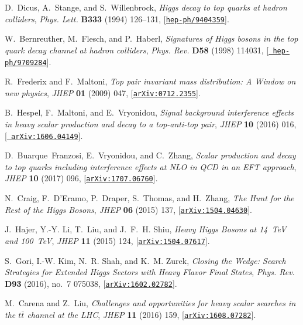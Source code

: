 \documentclass[a4paper, 11pt,notoc]{article}
\begin{document}
\begin{thebibliography}{100}
D.~Dicus, A.~Stange, and S.~Willenbrock, {\it {Higgs decay to top quarks at
  hadron colliders}},  {\em Phys. Lett.} {\bf B333} (1994) 126--131,
  [\href{http://arxiv.org/abs/hep-ph/9404359}{{\tt hep-ph/9404359}}].

W.~Bernreuther, M.~Flesch, and P.~Haberl, {\it {Signatures of Higgs bosons in
  the top quark decay channel at hadron colliders}},  {\em Phys. Rev.} {\bf
  D58} (1998) 114031, [\href{http://arxiv.org/abs/hep-ph/9709284}{{\tt
  hep-ph/9709284}}].

R.~Frederix and F.~Maltoni, {\it {Top pair invariant mass distribution: A
  Window on new physics}},  {\em JHEP} {\bf 01} (2009) 047,
  [\href{http://arxiv.org/abs/0712.2355}{{\tt arXiv:0712.2355}}].

B.~Hespel, F.~Maltoni, and E.~Vryonidou, {\it {Signal background interference
  effects in heavy scalar production and decay to a top-anti-top pair}},  {\em
  JHEP} {\bf 10} (2016) 016, [\href{http://arxiv.org/abs/1606.04149}{{\tt
  arXiv:1606.04149}}].

D.~Buarque~Franzosi, E.~Vryonidou, and C.~Zhang, {\it {Scalar production and
  decay to top quarks including interference effects at NLO in QCD in an EFT
  approach}},  {\em JHEP} {\bf 10} (2017) 096,
  [\href{http://arxiv.org/abs/1707.06760}{{\tt arXiv:1707.06760}}].

N.~Craig, F.~D'Eramo, P.~Draper, S.~Thomas, and H.~Zhang, {\it {The Hunt for
  the Rest of the Higgs Bosons}},  {\em JHEP} {\bf 06} (2015) 137,
  [\href{http://arxiv.org/abs/1504.04630}{{\tt arXiv:1504.04630}}].

J.~Hajer, Y.-Y. Li, T.~Liu, and J.~F.~H. Shiu, {\it {Heavy Higgs Bosons at 
14~TeV and 100~TeV}},  {\em JHEP} {\bf 11} (2015) 124,
  [\href{http://arxiv.org/abs/1504.07617}{{\tt arXiv:1504.07617}}].

S.~Gori, I.-W. Kim, N.~R. Shah, and K.~M. Zurek, {\it {Closing the Wedge:
  Search Strategies for Extended Higgs Sectors with Heavy Flavor Final
  States}},  {\em Phys. Rev.} {\bf D93} (2016), no.~7 075038,
  [\href{http://arxiv.org/abs/1602.02782}{{\tt arXiv:1602.02782}}].

M.~Carena and Z.~Liu, {\it {Challenges and opportunities for heavy scalar
  searches in the $ t\overline{t} $ channel at the LHC}},  {\em JHEP} {\bf 11}
  (2016) 159, [\href{http://arxiv.org/abs/1608.07282}{{\tt arXiv:1608.07282}}].


\end{thebibliography}
\end{document}
